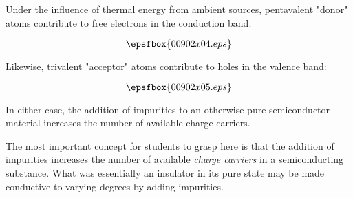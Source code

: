 
Under the influence of thermal energy from ambient sources, pentavalent "donor" atoms contribute to free electrons in the conduction band:

$$\epsfbox{00902x04.eps}$$

Likewise, trivalent "acceptor" atoms contribute to holes in the valence band:

$$\epsfbox{00902x05.eps}$$

In either case, the addition of impurities to an otherwise pure semiconductor material increases the number of available charge carriers.







The most important concept for students to grasp here is that the addition of impurities increases the number of available {\it charge carriers} in a semiconducting substance.  What was essentially an insulator in its pure state may be made conductive to varying degrees by adding impurities.




